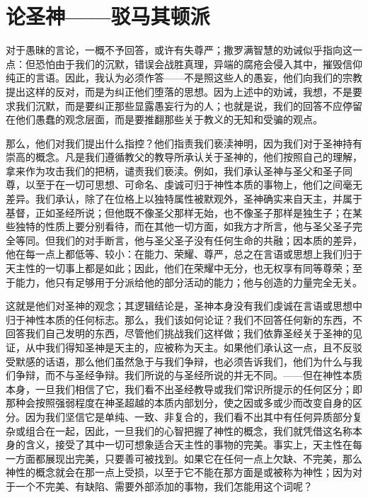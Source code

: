 
\chapter{论圣神——驳马其顿派}


对于愚昧的言论，一概不予回答，或许有失尊严；撒罗满智慧的劝诫似乎指向这一点：但恐怕由于我们的沉默，错误会战胜真理，异端的腐疮会侵入其中，摧毁信仰纯正的言语。因此，我认为必须作答——不是照这些人的愚妄，他们向我们的宗教提出这样的反对，而是为纠正他们堕落的思想。因为上述中的劝诫，我想，不是要求我们沉默，而是要纠正那些显露愚妄行为的人；也就是说，我们的回答不应停留在他们愚蠢的观念层面，而是要推翻那些关于教义的无知和受骗的观点。\par

那么，他们对我们提出什么指控？他们指责我们亵渎神明，因为我们对于圣神持有崇高的概念。凡是我们遵循教父的教导所承认关于圣神的，他们按照自己的理解，拿来作为攻击我们的把柄，谴责我们亵渎。例如，我们承认圣神与圣父和圣子同尊，以至于在一切可思想、可命名、虔诚可归于神性本质的事物上，他们之间毫无差异。我们承认，除了在位格上以独特属性被默观外，圣神确实来自天主，并属于基督，正如圣经所说；但他既不像圣父那样无始，也不像圣子那样是独生子；在某些独特的性质上要分别看待，而在其他一切方面，如我方才所言，他与圣父圣子完全等同。但我们的对手断言，他与圣父圣子没有任何生命的共融；因本质的差异，他在每一点上都低等、较小：在能力、荣耀、尊严，总之在言语或思想上我们归于天主性的一切事上都是如此；因此，他们在荣耀中无分，也无权享有同等尊荣；至于能力，他只有足够用于分派给他的部分活动的能力；他与创造的力量完全无关。\par

这就是他们对圣神的观念；其逻辑结论是，圣神本身没有我们虔诚在言语或思想中归于神性本质的任何标志。那么，我们该如何论证？我们不回答任何新的东西，不回答我们自己发明的东西，尽管他们挑战我们这样做；我们依靠圣经关于圣神的见证，从中我们得知圣神是天主的，应被称为天主。如果他们承认这一点，且不反驳受默感的话语，那么他们虽然急于与我们争辩，也必须告诉我们，他们为什么与我们争辩，而不与圣经争辩。我们所说的与圣经所说的并无不同。——但在神性本质本身，一旦我们相信了它，我们看不出圣经教导或我们常识所提示的任何区分；即那种会按照强弱程度在神圣超越的本质内部划分，使之因或多或少而改变自身的区分。因为我们坚信它是单纯、一致、非复合的，我们看不出其中有任何异质部分复杂或组合在一起，因此，一旦我们的心智把握了神性的概念，我们就凭借这名称本身的含义，接受了其中一切可想象适合天主性的事物的完美。事实上，天主性在每一方面都展现出完美，只要善可被找到。如果它在任何一点上欠缺、不完美，那么神性的概念就会在那一点上受损，以至于它不能在那方面是或被称为神性；因为对于一个不完美、有缺陷、需要外部添加的事物，我们怎能用这个词呢？\par

